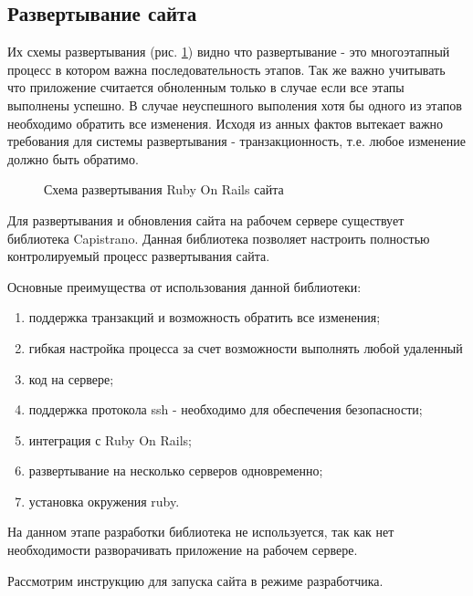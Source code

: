 \subsection{Развертывание сайта}
Их схемы развертывания (рис. \ref{ris:deployment_sait}) видно что развертывание - это
многоэтапный процесс в котором важна последовательность этапов. Так же важно учитывать что приложение
считается обноленным только в случае если все этапы выполнены успешно. В случае
неуспешного выполения хотя бы одного из этапов необходимо обратить все
изменения. Исходя из анных фактов вытекает важно требования для системы
развертывания - транзакционность, т.е. любое изменение должно быть обратимо.

\begin{figure}[h!]
\caption{Схема развертывания Ruby On Rails сайта}
\label{ris:deployment_sait}

% 
% 

\end{figure}

Для развертывания и обновления сайта на рабочем сервере существует библиотека
Capistrano. Данная библиотека позволяет настроить полностью контролируемый
процесс развертывания сайта.

Основные преимущества от использования данной библиотеки:
\begin{enumerate}
  \item поддержка транзакций и возможность обратить все изменения;
  \item гибкая настройка процесса за счет возможности выполнять любой удаленный
  \item код на сервере; 
  \item поддержка протокола ssh - необходимо для обеспечения безопасности; 
  \item интеграция с Ruby On Rails;
  \item развертывание на несколько серверов одновременно;
  \item установка окружения ruby.
\end{enumerate}

На данном этапе разработки библиотека не используется, так как нет необходимости
разворачивать приложение на рабочем сервере.

Рассмотрим инструкцию для запуска сайта в режиме разработчика.

